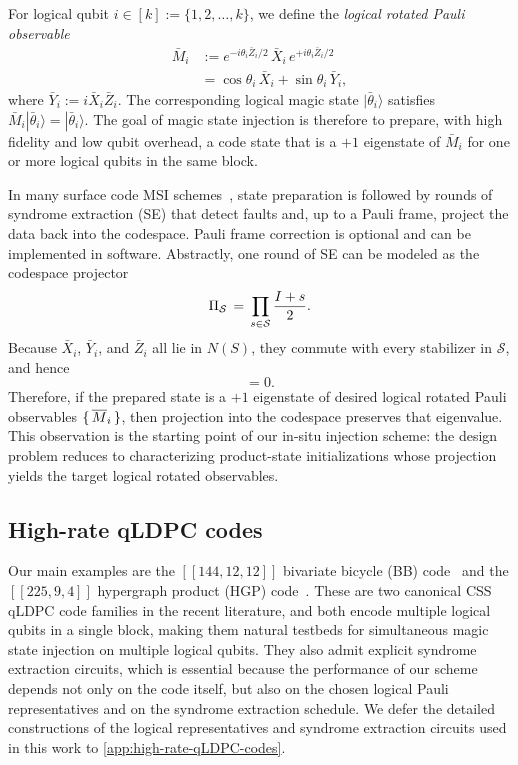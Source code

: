 For logical qubit $i\in [k]:=\{1,2,\dots,k\}$, we define the \emph{logical rotated Pauli observable}
\begin{equation}
\begin{aligned}
\bar M_i
&:= e^{-i\theta_i \bar Z_i/2}\,\bar X_i\,e^{+i\theta_i \bar Z_i/2} \\
&= \cos\theta_i\,\bar X_i + \sin\theta_i\,\bar Y_i,
\label{eq:logical-rotated-x}
\end{aligned}
\end{equation}
where $\bar Y_i:= i\bar X_i\bar Z_i$.
The corresponding logical magic state $|\bar\theta_i\rangle$ satisfies $\bar M_i|\bar\theta_i\rangle = |\bar\theta_i\rangle$.
The goal of magic state injection is therefore to prepare, with high fidelity and low qubit overhead, a code state that is a $+1$ eigenstate of $\bar M_i$ for one or more logical qubits in the same block.

In many surface code MSI schemes~\cite{li_magic_2015,lao_magic_2022,gidney_cleaner_2023}, state preparation is followed by rounds of syndrome extraction (SE) that detect faults and, up to a Pauli frame, project the data back into the codespace.
Pauli frame correction is optional and can be implemented in software.
Abstractly, one round of SE can be modeled as the codespace projector
\begin{equation}
\Pi_\mathcal{S} \,=\, \prod_{s\in\mathcal{S}} \frac{I+s}{2}.
\label{eq:projector}
\end{equation}
Because $\bar X_i$, $\bar Y_i$, and $\bar Z_i$ all lie in $N(S)$, they commute with every stabilizer in $\mathcal{S}$, and hence
\begin{equation}
[\bar M_i,\,\proj_\mathcal{S}] = 0.
\label{eq:commute-with-projector}
\end{equation}
Therefore, if the prepared state is a $+1$ eigenstate of desired logical rotated Pauli observables $\set{\overline{M}_i}$, then projection into the codespace preserves that eigenvalue.
This observation is the starting point of our in-situ injection scheme: the design problem reduces to characterizing product-state initializations whose projection yields the target logical rotated observables.


\subsection{High-rate qLDPC codes}

Our main examples are the $[[144,12,12]]$ bivariate bicycle (BB) code~\cite{bravyi_high-threshold_2024} and the $[[225,9,4]]$ hypergraph product (HGP) code~\cite{xu_constant-overhead_2023}.
These are two canonical CSS qLDPC code families in the recent literature, and both encode multiple logical qubits in a single block, making them natural testbeds for simultaneous magic state injection on multiple logical qubits.
They also admit explicit syndrome extraction circuits, which is essential because the performance of our scheme depends not only on the code itself, but also on the chosen logical Pauli representatives and on the syndrome extraction schedule.
We defer the detailed constructions of the logical representatives and syndrome extraction circuits used in this work to \cref{app:high-rate-qLDPC-codes}.